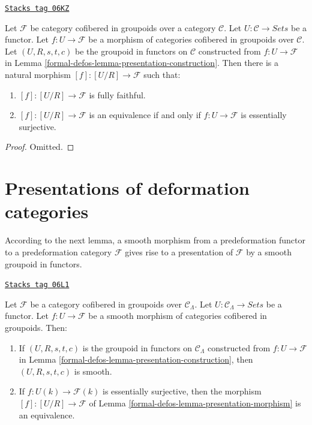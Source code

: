 \begin{lemma}
\label{formal-defos-lemma-presentation-morphism}
\href{https://stacks.math.columbia.edu/tag/06KZ}{\texttt{Stacks tag 06KZ}}

Let $\mathcal{F}$ be category cofibered in groupoids over a category
$\mathcal{C}$. Let $U : \mathcal{C} \to \textit{Sets}$ be a functor.
Let $f : U \to \mathcal{F}$ be a morphism of categories cofibered in groupoids
over $\mathcal{C}$. Let $(U, R, s, t, c)$ be the groupoid in functors on
$\mathcal{C}$ constructed from $f : U \to \mathcal{F}$ in
Lemma \ref{formal-defos-lemma-presentation-construction}.
Then there is a natural morphism $[f] : [U/R] \to \mathcal{F}$ such that:
\begin{enumerate}
\item $[f]: [U/R] \to \mathcal{F}$ is fully faithful.
\item $[f]: [U/R] \to \mathcal{F}$ is an equivalence if and only if
$f : U \to \mathcal{F}$ is essentially surjective.
\end{enumerate}
\end{lemma}

\begin{proof}
Omitted.
\end{proof}

\section{Presentations of deformation categories}
\label{formal-defos-section-presentation-deformation-categories}
According to the next lemma, a smooth morphism from a predeformation functor to
a predeformation category $\mathcal{F}$ gives rise to a presentation of
$\mathcal{F}$ by a smooth groupoid in functors.

\begin{lemma}
\label{formal-defos-lemma-smooth-groupoid-in-functors-construction}
\href{https://stacks.math.columbia.edu/tag/06L1}{\texttt{Stacks tag 06L1}}

Let $\mathcal{F}$ be a category cofibered in groupoids over
$\mathcal{C}_\Lambda$. Let $U : \mathcal{C}_\Lambda \to \textit{Sets}$
be a functor. Let $f : U \to \mathcal{F}$ be a smooth morphism of
categories cofibered in groupoids. Then:
\begin{enumerate}
\item If $(U, R, s, t, c)$ is the groupoid in functors on
$\mathcal{C}_\Lambda$ constructed from $f : U \to \mathcal{F}$ in
Lemma \ref{formal-defos-lemma-presentation-construction}, then $(U, R, s, t, c)$
is smooth.
\item If $f : U(k) \to \mathcal{F}(k)$ is essentially surjective,
then the morphism $[f] : [U/R] \to \mathcal{F}$ of
Lemma \ref{formal-defos-lemma-presentation-morphism}
is an equivalence.
\end{enumerate}
\end{lemma}

